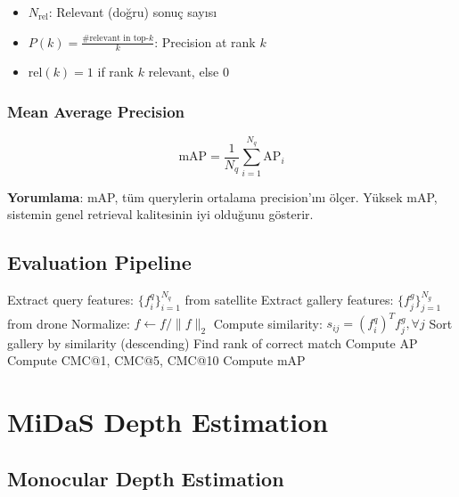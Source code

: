 \documentclass[12pt,a4paper]{article}
\begin{document}
\begin{itemize}
    \item $N_{\text{rel}}$: Relevant (doğru) sonuç sayısı
    \item $P(k) = \frac{\text{\# relevant in top-}k}{k}$: Precision at rank $k$
    \item $\text{rel}(k) = 1$ if rank $k$ relevant, else 0
\end{itemize}

\subsubsection{Mean Average Precision}
\begin{equation}
    \text{mAP} = \frac{1}{N_q} \sum_{i=1}^{N_q} \text{AP}_i
\end{equation}

\textbf{Yorumlama}: mAP, tüm querylerin ortalama precision'ını ölçer. Yüksek mAP, sistemin genel retrieval kalitesinin iyi olduğunu gösterir.

\subsection{Evaluation Pipeline}

\begin{algorithm}[H]
\caption{Cross-View Evaluation}
\begin{algorithmic}[1]
\STATE Extract query features: $\{f_i^q\}_{i=1}^{N_q}$ from satellite
\STATE Extract gallery features: $\{f_j^g\}_{j=1}^{N_g}$ from drone
\STATE Normalize: $f \leftarrow f / \|f\|_2$
    \STATE Compute similarity: $s_{ij} = (f_i^q)^T f_j^g, \forall j$
    \STATE Sort gallery by similarity (descending)
    \STATE Find rank of correct match
    \STATE Compute AP
\ENDFOR
\STATE Compute CMC@1, CMC@5, CMC@10
\STATE Compute mAP
\end{algorithmic}
\end{algorithm}

\section{MiDaS Depth Estimation}

\subsection{Monocular Depth Estimation}
\end{document}
